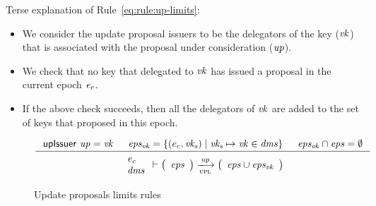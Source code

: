 Terse explanation of Rule~\ref{eq:rule:up-limits}:
\begin{itemize}
\item We consider the update proposal issuers to be the delegators of the key
  ($\mathit{vk}$) that is associated with the proposal under consideration
  ($\mathit{up}$).
\item We check that no key that delegated to $\mathit{vk}$ has issued a proposal
  in the current epoch $\mathit{e_c}$.
\item If the above check succeeds, then all the delegators of $\mathit{vk}$ are
  added to the set of keys that proposed in this epoch.
\end{itemize}

\begin{figure}[htb]
  \begin{equation}
    \label{eq:rule:up-limits}
    \inference
    {\upIssuer{up} = \var{vk}
      & \var{eps_{vk}} = \{ (e_c, \var{vk_s})
      \mid \var{vk_s} \mapsto \var{vk} \in \var{dms}\}
      & \var{eps_{vk}} \cap \var{eps} = \emptyset
    }
    {
      {\begin{array}{l}
         \var{e_c}\\
         \var{dms}
       \end{array}
      }
      \vdash
      {
        \left(
          \begin{array}{l}
            \var{eps}
          \end{array}
        \right)
      }
      \trans{upl}{\var{up}}
      {
        \left(
          \begin{array}{l}
            \var{eps} \cup \var{eps_{vk}}
          \end{array}
        \right)
      }
    }
  \end{equation}
  \caption{Update proposals limits rules}
  \label{fig:rules:up-limits}
\end{figure}

